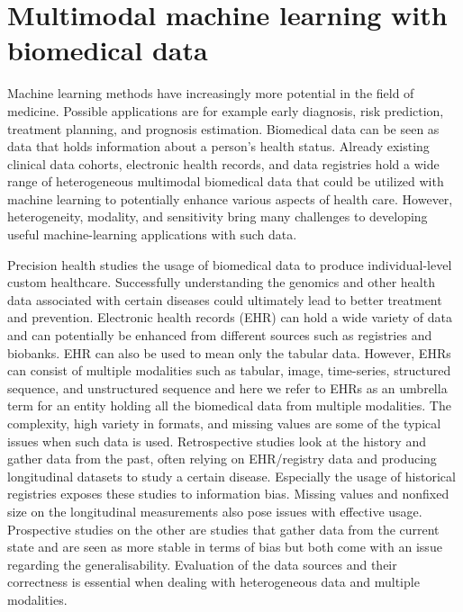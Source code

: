 \chapter{Multimodal machine learning with biomedical data\label{Essay}}



Machine learning methods have increasingly more potential in the field of medicine. Possible applications are for example early diagnosis, risk prediction, treatment planning, and prognosis estimation. Biomedical data can be seen as data that holds information about a person's health status. Already existing clinical data cohorts, electronic health records, and data registries hold a wide range of heterogeneous multimodal biomedical data that could be utilized with machine learning to potentially enhance various aspects of health care.  However, heterogeneity, modality, and sensitivity bring many challenges to developing useful machine-learning applications with such data. 

Precision health studies the usage of biomedical data to produce individual-level custom healthcare. Successfully understanding the genomics and other health data associated with certain diseases could ultimately lead to better treatment and prevention. Electronic health records (EHR) can hold a wide variety of data and can potentially be enhanced from different sources such as registries and biobanks. EHR can also be used to mean only the tabular data. However, EHRs can consist of multiple modalities such as tabular, image, time-series, structured sequence, and unstructured sequence and here we refer to EHRs as an umbrella term for an entity holding all the biomedical data from multiple modalities. The complexity, high variety in formats, and missing values are some of the typical issues when such data is used. Retrospective studies look at the history and gather data from the past, often relying on EHR/registry data and producing longitudinal datasets to study a certain disease. Especially the usage of historical registries exposes these studies to information bias. Missing values and nonfixed size on the longitudinal measurements also pose issues with effective usage. Prospective studies on the other are studies that gather data from the current state and are seen as more stable in terms of bias but both come with an issue regarding the generalisability. Evaluation of the data sources and their correctness is essential when dealing with heterogeneous data and multiple modalities. 

